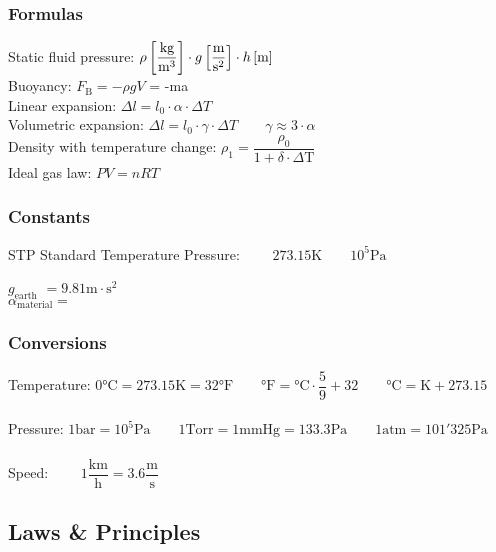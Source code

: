 \subsubsection{Formulas}

Static fluid pressure: $
    \rho\left[\dfrac{\text{kg}}{\text{m}^\text{3}}\right]\cdot 
    g\left[\dfrac{\text{m}}{\text{s}^\text{2}}\right]\cdot
    h\left[\text{m}\right]$
\\
Buoyancy: $F_\text{B} = -\rho gV$ = -ma
\\
Linear expansion: $\Delta l = l_0 \cdot \alpha \cdot \Delta T$
\\
Volumetric expansion: $\Delta l = l_0 \cdot \gamma \cdot \Delta T \qquad \gamma \approx 3\cdot\alpha$
\\
Density with temperature change: $\rho_1 = \dfrac{\rho_0}{1+\delta\cdot\Delta\text{T}}$
\\
Ideal gas law: $PV = nRT$
\subsubsection{Constants}

STP Standard Temperature Pressure: $\qquad 273.15\text{K} \qquad 10^5\text{Pa}$ 

$g_\text{earth}$ $= 9.81 \text{m}\cdot\text{s}^\text{2}$ \\
$\alpha_\text{material} = $

\subsubsection{Conversions}

Temperature: \qquad $0\text{°C} = 273.15\text{K}=32\text{°F} \qquad \text{°F} = \text{°C} \cdot \dfrac{5}{9} + 32 \qquad \text{°C} = \text{K} + 273.15$
\\\\
Pressure: \qquad
  $1\text{bar} = 10^5\text{Pa} \qquad 
   1\text{Torr} = 1\text{mmHg} = 133.3\text{Pa} \qquad
   1\text{atm} = 101'325\text{Pa}$
\\\\
Speed: $\qquad 1\dfrac{\text{km}}{\text{h}}     = 3.6\dfrac{\text{m}}{\text{s}}$

\subsection{Laws \& Principles}

